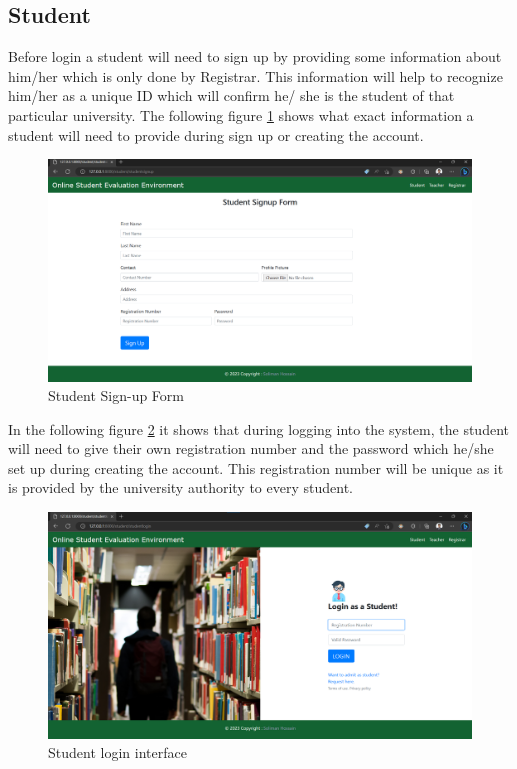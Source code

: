 \subsection{Student}
Before login a student will need to sign up by providing some information about him/her which is only done by Registrar. This information will help to recognize him/her as a unique ID which will confirm he/ she is the student of that particular university. The following figure \ref{fig:stduentsign} shows what exact information a student will need to provide during sign up or creating the account.
\begin{figure}[H]
    \centering
    \includegraphics[scale=.35]{img/stduentsign.png}
    \caption{Student Sign-up Form}
    \label{fig:stduentsign}
\end{figure}
In the following figure \ref{fig:stduentlogin} it shows that during logging into the system, the student will need to give their own registration number and the password which he/she set up during creating the account. This registration number will be unique as it is provided by the university authority to every student. 
\begin{figure}[H]
    \centering
    \includegraphics[scale=.35]{img/stduentlogin.png}
    \caption{Student login interface}
    \label{fig:stduentlogin}
\end{figure}
